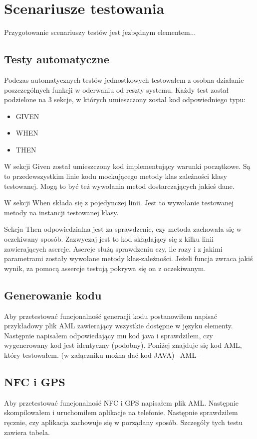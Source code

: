 \documentclass	{xmgr}
\begin{document}
\section{Scenariusze testowania}
Przygotowanie scenariuszy testów jest jezbędnym elementem...
\subsection{Testy automatyczne }
Podczas  automatycznych testów jednostkowych testowałem z osobna działanie poszczególnych funkcji w oderwaniu od reszty systemu. Każdy test został podzielone na 3 sekcje, w których umieszczony został kod odpowiedniego typu:
\begin{itemize}
\item GIVEN
\item WHEN
\item THEN
\end{itemize}

W sekcji Given został umieszczony kod implementujący warunki początkowe. Są to przedewszystkim linie kodu mockującego metody klas zależności klasy testowanej. Mogą to być też wywołania metod dostarczających jakieś dane. 

W sekcji When składa się z pojedynczej linii. Jest to wywołanie testowanej metody na instancji testowanej klasy.

Sekcja Then odpowiedzialna jest za sprawdzenie, czy metoda zachowała się w oczekiwany sposób. Zazwyczaj jest to kod skłądający się z kilku linii zawierających asercje. Asercje służą sprawdzeniu czy, ile razy i z jakimi parametrami zostały wywołane metody klas-zależności. Jeżeli funcja zwraca jakiś wynik, za pomocą assercje testują pokrywa się on z oczekiwanym.

\subsection{Generowanie kodu}
Aby przetestować funcjonalność generacji kodu postanowiłem napisać przykładowy plik AML zawierający wszystkie dostępne w języku elementy. Następnie napisałem odpowiedający mu kod java i sprawdziłem, czy wygenerowany kod jest identyczny (podobny).  
Poniżej znajduje się kod AML, który testowałem. (w załączniku można dać kod JAVA)
--AML--

\subsection{NFC i GPS}
Aby przetestować funcjonalność NFC i GPS napisałem plik AML. Następnie skompilowałem i uruchomiłem aplikacje na telefonie. 
Następnie sprawdziłem ręcznie, czy aplikacja zachowuje się w porządany sposób.
Szczegóły tych testu zawiera tabela.
\end{document}
